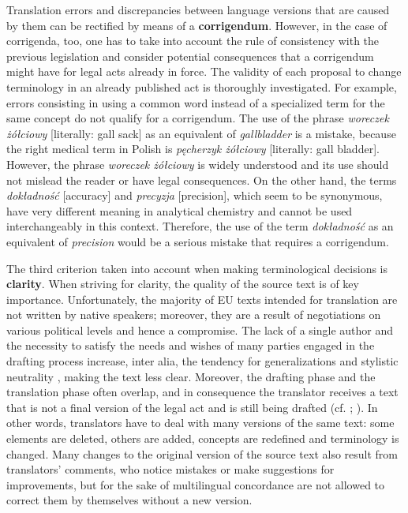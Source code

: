 \documentclass[output=paper]{langsci/langscibook}
\begin{document}
Translation errors and discrepancies between language versions that are caused by them can be rectified by means of a \textbf{corrigendum}. However, in the case of corrigenda, too, one has to take into account the rule of consistency with the previous legislation and consider potential consequences that a corrigendum might have for legal acts already in force. The validity of each proposal to change terminology in an already published act is thoroughly investigated. For example, errors consisting in using a common word instead of a specialized term for the same concept do not qualify for a corrigendum. The use of the phrase \textit{woreczek żółciowy} [literally: gall sack] as an equivalent of \textit{gallbladder} is a mistake, because the right medical term in Polish is \textit{pęcherzyk żółciowy} [literally: gall bladder]. However, the phrase \textit{woreczek żółciowy} is widely understood and its use should not mislead the reader or have legal consequences. On the other hand, the terms \textit{dokładność} [accuracy] and \textit{precyzja} [precision], which seem to be synonymous, have very different meaning in analytical chemistry and cannot be used interchangeably in this context. Therefore, the use of the term \textit{dokładność} as an equivalent of \textit{precision} would be a serious mistake that requires a corrigendum.

The third criterion taken into account when making terminological decisions is \textbf{clarity}. When striving for clarity, the quality of the source text is of key importance. Unfortunately, the majority of EU texts intended for translation are not written by native speakers; moreover, they are a result of negotiations on various political levels and hence a compromise. The lack of a single author and the necessity to satisfy the needs and wishes of many parties engaged in the drafting process increase, inter alia, the tendency for generalizations and stylistic neutrality \citep{Koskinen2008}, making the text less clear. Moreover, the drafting phase and the translation phase often overlap, and in consequence the translator receives a text that is not a final version of the legal act and is still being drafted (cf. \citealt{Doczekalska2009production}; \citealt{Stefaniak2013}). In other words, translators have to deal with many versions of the same text: some elements are deleted, others are added, concepts are redefined and terminology is changed. Many changes to the original version of the source text also result from translators’ comments, who notice mistakes or make suggestions for improvements, but for the sake of multilingual concordance are not allowed to correct them by themselves without a new version.
\end{document}
